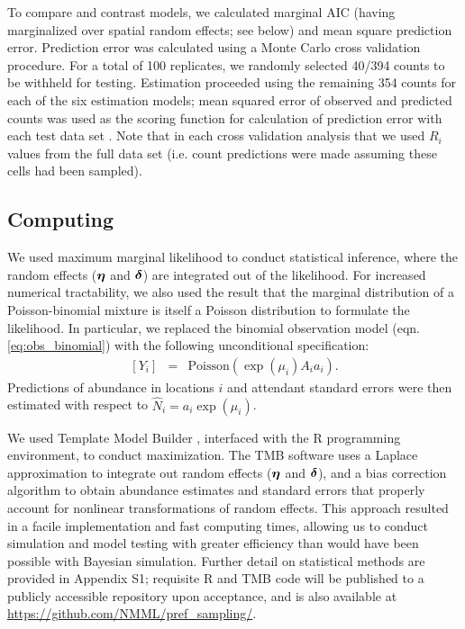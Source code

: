 \documentclass[times,mee,doublespace,]{besauth2}
\begin{document}
To compare and contrast models, we calculated marginal AIC (having marginalized over spatial random effects; see below) and mean square prediction error. Prediction error was calculated using a Monte Carlo cross validation procedure.  For a total of 100 replicates, we randomly selected 40/394 counts to be withheld for testing.  Estimation proceeded using the remaining 354 counts for each of the six estimation models; mean squared error of observed and predicted counts was used as the scoring function for calculation of prediction error with each test data set \citep{HootenHobbs2015}.  Note that in each cross validation analysis that we used $R_i$ values from the full data set (i.e. count predictions were made assuming these cells had been sampled).

\subsection{Computing}

We used maximum marginal likelihood to conduct statistical inference, where the random effects ($\boldsymbol{\eta}$ and $\boldsymbol{\delta}$) are integrated out of the likelihood. For increased numerical tractability, we also used the result that the marginal distribution of a Poisson-binomial mixture is itself a Poisson distribution to formulate the likelihood.  In particular, we replaced the binomial observation model (eqn. \ref{eq:obs_binomial}) with the following unconditional specification:
\begin{eqnarray}
\label{eq:obs_pois}
   [Y_i] & = & \text{Poisson}(\exp(\mu_i) A_i a_i).
\end{eqnarray}
Predictions of abundance in locations $i$ and attendant standard errors were then estimated with respect to $\hat{N}_i = a_i \exp(\mu_i)$.

We used Template Model Builder \citep[TMB; ][]{KristensenEtAl2016}, interfaced with the R programming environment, to conduct maximization. The TMB software uses a Laplace approximation to integrate out random effects ($\boldsymbol{\eta}$ and $\boldsymbol{\delta}$), and a bias correction algorithm \citep{TierneyEtAl1989,ThorsonKristensen2016} to obtain abundance estimates and standard errors that properly account for nonlinear transformations of random effects.  This approach resulted in a facile implementation and fast computing times, allowing us to conduct simulation and model testing with greater efficiency than would have been possible with Bayesian simulation.  Further detail on statistical methods are provided in Appendix S1; requisite R and TMB code will be published to a publicly accessible repository upon acceptance, and is also available at \url{https://github.com/NMML/pref_sampling/}.
\end{document}
